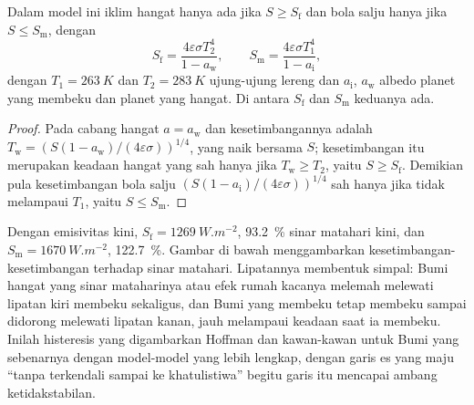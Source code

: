 \begin{proposition}\label{prop:b2:precambrian-earth:tipping}
Dalam model ini iklim hangat hanya ada jika $S \ge S_{\text{f}}$ dan bola salju hanya jika
$S \le S_{\text{m}}$, dengan
\[
  S_{\text{f}} = \frac{4\varepsilon\sigma T_2^4}{1 - a_{\text{w}}}, \qquad
  S_{\text{m}} = \frac{4\varepsilon\sigma T_1^4}{1 - a_{\text{i}}},
\]
dengan $T_1 = \qty{263}{K}$ dan $T_2 = \qty{283}{K}$ ujung-ujung lereng dan $a_{\text{i}}$,
$a_{\text{w}}$ albedo planet yang membeku dan planet yang hangat. Di antara $S_{\text{f}}$ dan
$S_{\text{m}}$ keduanya ada.
\end{proposition}

\begin{proof}
Pada cabang hangat $a = a_{\text{w}}$ dan kesetimbangannya adalah $T_{\text{w}} = (S(1 -
a_{\text{w}})/(4\varepsilon\sigma))^{1/4}$, yang naik bersama $S$; kesetimbangan itu merupakan keadaan hangat yang sah hanya
jika $T_{\text{w}} \ge T_2$, yaitu $S \ge S_{\text{f}}$. Demikian pula kesetimbangan bola salju
$(S(1 - a_{\text{i}})/(4\varepsilon\sigma))^{1/4}$ sah hanya jika tidak melampaui $T_1$, yaitu
$S \le S_{\text{m}}$.
\end{proof}

Dengan emisivitas kini, $S_{\text{f}} = \qty{1269}{W.m^{-2}}$, \qty{93.2}{\percent} sinar matahari
kini, dan $S_{\text{m}} = \qty{1670}{W.m^{-2}}$, \qty{122.7}{\percent}. Gambar di bawah
menggambarkan kesetimbangan-kesetimbangan terhadap sinar matahari. Lipatannya membentuk simpal: Bumi hangat yang sinar mataharinya
atau efek rumah kacanya melemah melewati lipatan kiri membeku sekaligus, dan Bumi yang membeku tetap membeku
sampai didorong melewati lipatan kanan, jauh melampaui keadaan saat ia membeku. Inilah
histeresis yang digambarkan Hoffman dan kawan-kawan untuk Bumi yang sebenarnya dengan model-model yang lebih lengkap,
dengan garis es yang maju ``tanpa terkendali sampai ke khatulistiwa'' begitu garis itu mencapai ambang
ketidakstabilan.

